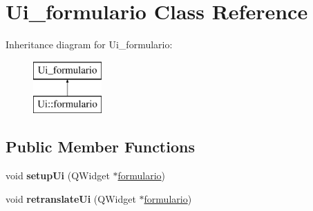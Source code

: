 \hypertarget{class_ui__formulario}{}\section{Ui\+\_\+formulario Class Reference}
\label{class_ui__formulario}
Inheritance diagram for Ui\+\_\+formulario\+:\begin{figure}[H]
\begin{center}
\leavevmode
\includegraphics[height=2.000000cm]{class_ui__formulario}
\end{center}
\end{figure}
\subsection*{Public Member Functions}
\begin{DoxyCompactItemize}
\item 
\mbox{\label{class_ui__formulario_a1e306ef2fc8720695bbcd0f9c0a4033a}} 
void {\bfseries setup\+Ui} (Q\+Widget $\ast$\hyperlink{classformulario}{formulario})
\item 
\mbox{\label{class_ui__formulario_a0945c2c0fa76524453b77a93ad108467}} 
void {\bfseries retranslate\+Ui} (Q\+Widget $\ast$\hyperlink{classformulario}{formulario})
\end{DoxyCompactItemize}
